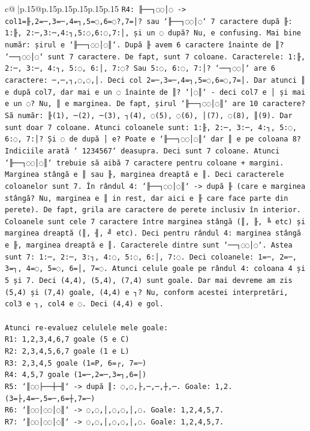 \documentclass{article}
\begin{document}
{\begin{supertabular}{c@{$\;$}|p{.15\linewidth}@{}p{.15\linewidth}p{.15\linewidth}p{.15\linewidth}p{.15\linewidth}p{.15\linewidth}}
{{{\texttt{R4: ╟──┐◌◌│◌ {-}> col1=╟,2=─,3=─,4=┐,5=◌,6=◌?,7=│? sau `╟──┐◌◌│◌` 7 caractere după ╟: 1:╟, 2:─,3:─,4:┐,5:◌,6:◌,7:│, și un ◌ după? Nu, e confusing. Mai bine număr: șirul e `╟──┐◌◌│◌║`. După ╟ avem 6 caractere înainte de ║? `──┐◌◌│◌` sunt 7 caractere. De fapt, sunt 7 coloane. Caracterele: 1:╟, 2:─, 3:─, 4:┐, 5:◌, 6:│, 7:◌? Sau 5:◌, 6:◌, 7:│? `──┐◌◌│` are 6 caractere: ─,─,┐,◌,◌,│. Deci col 2=─,3=─,4=┐,5=◌,6=◌,7=│. Dar atunci ║ e după col7, dar mai e un ◌ înainte de ║? `│◌║` {-} deci col7 e │ și mai e un ◌? Nu, ║ e marginea. De fapt, șirul `╟──┐◌◌│◌║` are 10 caractere? Să număr: ╟(1), ─(2), ─(3), ┐(4), ◌(5), ◌(6), │(7), ◌(8), ║(9). Dar sunt doar 7 coloane. Atunci coloanele sunt: 1:╟, 2:─, 3:─, 4:┐, 5:◌, 6:◌, 7:│? Și ◌ de după │ e? Poate e `╟──┐◌◌│◌║` dar ║ e pe coloana 8? Indiciile arată ` 1234567` deasupra. Deci sunt 7 coloane. Atunci `╟──┐◌◌│◌║` trebuie să aibă 7 caractere pentru coloane + margini. Marginea stângă e ║ sau ╟, marginea dreaptă e ║. Deci caracterele coloanelor sunt 7. În rândul 4: `╟──┐◌◌│◌║` {-}> după ╟ (care e marginea stângă? Nu, marginea e ║ in rest, dar aici e ╟ care face parte din perete). De fapt, grila are caractere de perete inclusiv în interior. Coloanele sunt cele 7 caractere între marginea stângă (║, ╟, ╚ etc) și marginea dreaptă (║, ╢, ╝ etc). Deci pentru rândul 4: marginea stângă e ╟, marginea dreaptă e ║. Caracterele dintre sunt `──┐◌◌│◌`. Astea sunt 7: 1:─, 2:─, 3:┐, 4:◌, 5:◌, 6:│, 7:◌. Deci coloanele: 1=─, 2=─, 3=┐, 4=◌, 5=◌, 6=│, 7=◌. Atunci celule goale pe rândul 4: coloana 4 și 5 și 7. Deci (4,4), (5,4), (7,4) sunt goale. Dar mai devreme am zis (5,4) și (7,4) goale, (4,4) e ┐? Nu, conform acestei interpretări, col3 e ┐, col4 e ◌. Deci (4,4) e gol.} \\
\\ 
\texttt{Atunci re{-}evaluez celulele mele goale:} \\
\texttt{R1: 1,2,3,4,6,7 goale (5 e C)} \\
\texttt{R2: 2,3,4,5,6,7 goale (1 e L)} \\
\texttt{R3: 2,3,4,5 goale (1=P, 6=┌, 7=─)} \\
\texttt{R4: 4,5,7 goale (1=─,2=─,3=┐,6=│)} \\
\texttt{R5: `║◌◌├──┼─╢` {-}> după ║: ◌,◌,├,─,─,┼,─. Goale: 1,2. (3=├,4=─,5=─,6=┼,7=─)} \\
\texttt{R6: `║◌◌│◌◌│◌║` {-}> ◌,◌,│,◌,◌,│,◌. Goale: 1,2,4,5,7.} \\
\texttt{R7: `║◌◌│◌◌│◌║` {-}> ◌,◌,│,◌,◌,│,◌. Goale: 1,2,4,5,7.} \\
\\ 
}}}
\end{supertabular}}
\end{document}
